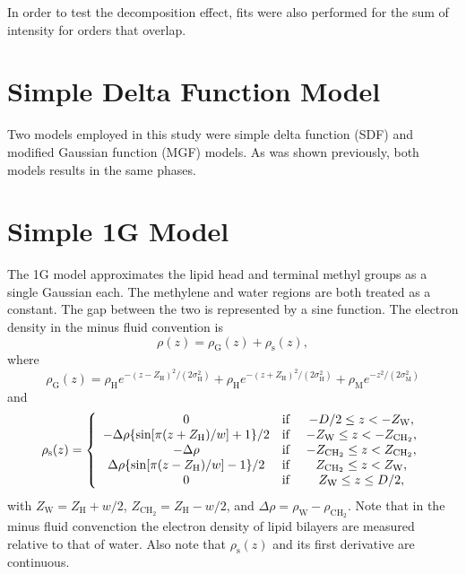 \documentclass[12pt,letterpaper]{article}
\newcommand{\zw}{Z_\mathrm{W}}
\newcommand{\zchtwo}{Z_\mathrm{CH_2}}
\newcommand{\zh}{Z_\mathrm{H}}
\newcommand{\sigmah}{\sigma_\mathrm{H}}
\newcommand{\sigmam}{\sigma_\mathrm{M}}
\newcommand{\rhoh}{\rho_\mathrm{H}}
\newcommand{\rhom}{\rho_\mathrm{M}}
\newcommand{\rhog}{\rho_\mathrm{G}}
\newcommand{\rhos}{\rho_\mathrm{s}}
\newcommand{\rhow}{\rho_\mathrm{W}}
\newcommand{\rhochtwo}{\rho_\mathrm{CH_2}}
\begin{document}
In order to test the decomposition effect, fits were also performed
for the sum of intensity for orders that overlap. 

\section{Simple Delta Function Model}
Two models employed in this study were simple delta function (SDF) and
modified Gaussian function (MGF) models. As was shown previously,
both models results in the same phases.

\section{Simple 1G Model}
The 1G model approximates the lipid head 
and terminal methyl groups as a single 
Gaussian each. The methylene and water regions are both treated as a constant.
The gap between the two is represented by a sine function. The electron
density in the minus fluid convention is
\begin{equation}
  \rho(z) = \rhog(z) + \rhos(z),
\end{equation}
where
\begin{equation}
  \rhog(z) = \rhoh e^{-(z-\zh)^2/(2\sigmah^2)} + 
             \rhoh e^{-(z+\zh)^2/(2\sigmah^2)} + \rhom e^{-z^2/(2\sigmam^2)}
\end{equation}
and
\begin{equation}
  \rhos(z) =  \left\{
    \begin{array}{ccc}
      0 & \text{if } & -D/2 \leq z < -\zw,\\
      -\Delta\rho\braces{\sin\bracks{\pi(z+\zh)/w}+1}/2 
        & \text{if } & -\zw \leq z < -\zchtwo,\\
      -\Delta\rho & \text{if } & -\zchtwo \leq z < \zchtwo,\\
      \Delta\rho\braces{\sin\bracks{\pi(z-\zh)/w}-1}/2 
        & \text{if } & \zchtwo \leq z < \zw,\\
      0 & \text{if } & \zw \leq z \leq D/2,
    \end{array}
  \right.
\end{equation}
with $\zw=\zh+w/2$, $\zchtwo=\zh-w/2$, and $\Delta\rho=\rhow-\rhochtwo$. 
Note that in the minus fluid convenction the electron density 
of lipid bilayers are measured relative to that of water. Also note that 
$\rhos(z)$ and its first derivative are continuous.
\end{document}
